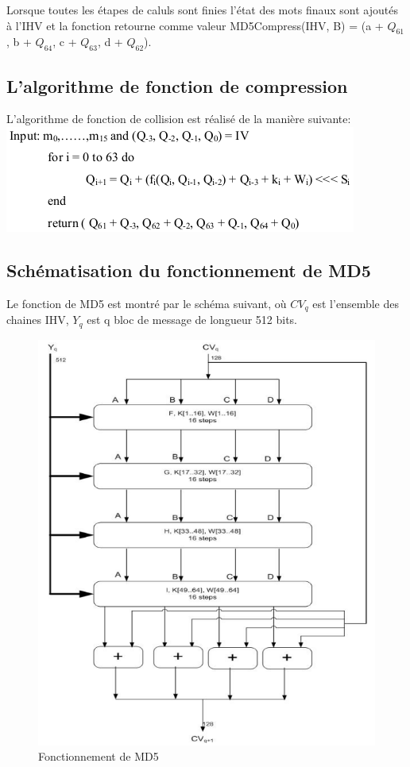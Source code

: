 \documentclass[a4paper,11pt,french]{article}
\begin{document}
Lorsque toutes les étapes de caluls sont finies l'état des mots finaux sont ajoutés à l'IHV et la fonction retourne comme valeur MD5Compress(IHV, B) = (a + $Q_{61}$, b + $Q_{64}$, c + $Q_{63}$, d + $Q_{62}$).

\subsection{L'algorithme de fonction de compression}
L'algorithme de fonction de collision est réalisé de la manière suivante:\\

\includegraphics[scale=.61]{./pics/algocom.png}

\subsection{Schématisation du fonctionnement de MD5}
Le fonction de MD5 est montré par le schéma suivant, où $CV_{q}$ est l'ensemble des chaines IHV, $Y_{q}$ est q bloc de message de longueur 512 bits.\\

\begin{figure}[h!]
  \includegraphics[scale=.61]{./pics/md5process.png}
  \caption{Fonctionnement de MD5}
\end{figure}
\end{document}

